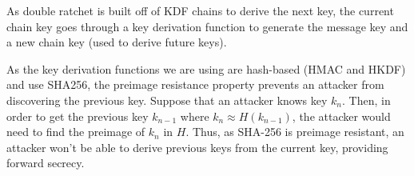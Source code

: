 As double ratchet is built off of KDF chains to derive the next key, the current chain key goes through 
a key derivation function to generate the message key and a new chain key (used to derive future keys).

As the key derivation functions we are using are hash-based (HMAC and HKDF) and use SHA256, the preimage 
resistance property prevents an attacker from discovering the previous key. Suppose that an attacker knows 
key $k_n$. Then, in order to get the previous key $k_{n-1}$ where $k_n\approx H(k_{n-1})$, the attacker would need to find 
the preimage of $k_n$ in $H$. Thus, as SHA-256 is preimage resistant, an attacker won't be able to derive previous 
keys from the current key, providing forward secrecy.
